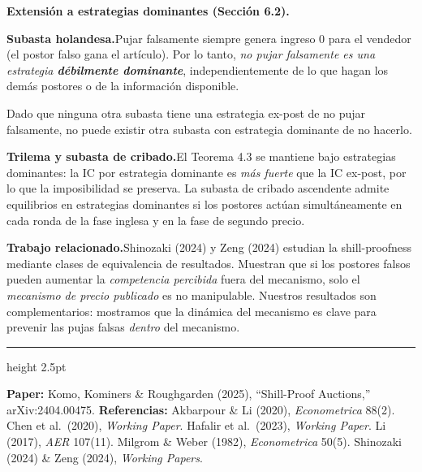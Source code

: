 \documentclass[20pt]{extarticle}
\renewcommand{\small}{\fontsize{20}{25}\selectfont}
\renewcommand{\footnotesize}{\fontsize{18}{22}\selectfont}
\begin{document}
\begin{minipage}[t]{35cm}
  \vspace{8mm}
  {\small\textbf{Extensión a estrategias dominantes (Sección 6.2).}}
  \vspace{5mm}
  \begin{tcolorbox}[rbar]
    \footnotesize\textbf{Subasta holandesa.}\enspace Pujar falsamente siempre genera ingreso 0 para el vendedor (el postor falso gana el artículo). Por lo tanto, \emph{no pujar falsamente es una estrategia \textbf{débilmente dominante}}, independientemente de lo que hagan los demás postores o de la información disponible.

    \smallskip Dado que ninguna otra subasta tiene una estrategia ex-post de no pujar falsamente, no puede existir otra subasta con estrategia dominante de no hacerlo.
  \end{tcolorbox}

  \vspace{6mm}
  \begin{tcolorbox}[gbar]
    \footnotesize\textbf{Trilema y subasta de cribado.}\enspace El Teorema 4.3 se mantiene bajo estrategias dominantes: la IC por estrategia dominante es \emph{más fuerte} que la IC ex-post, por lo que la imposibilidad se preserva. La subasta de cribado ascendente admite equilibrios en estrategias dominantes si los postores actúan simultáneamente en cada ronda de la fase inglesa y en la fase de segundo precio.
  \end{tcolorbox}

  \vspace{6mm}
  \begin{tcolorbox}[bbar]
    \footnotesize\textbf{Trabajo relacionado.}\enspace Shinozaki (2024) y Zeng (2024) estudian la shill-proofness mediante clases de equivalencia de resultados. Muestran que si los postores falsos pueden aumentar la \emph{competencia percibida} fuera del mecanismo, solo el \emph{mecanismo de precio publicado} es no manipulable. Nuestros resultados son complementarios: mostramos que la dinámica del mecanismo es clave para prevenir las pujas falsas \emph{dentro} del mecanismo.
  \end{tcolorbox}

\end{minipage}

\vspace{14mm}
\noindent\hspace{3cm}%
\begin{minipage}{84cm}
  {\color{rulegray}\hrule height 2.5pt}
  \vspace{5mm}
  {\footnotesize\color{muted}
    \textbf{Paper:} Komo, Kominers \& Roughgarden (2025), ``Shill-Proof Auctions,'' arXiv:2404.00475.\quad
    \textbf{Referencias:}
    Akbarpour \& Li (2020), \textit{Econometrica} 88(2).
    Chen et al.\ (2020), \textit{Working Paper}.
    Hafalir et al.\ (2023), \textit{Working Paper}.
    Li (2017), \textit{AER} 107(11).
    Milgrom \& Weber (1982), \textit{Econometrica} 50(5).
    Shinozaki (2024) \& Zeng (2024), \textit{Working Papers}.
  }
\end{minipage}
\end{document}
